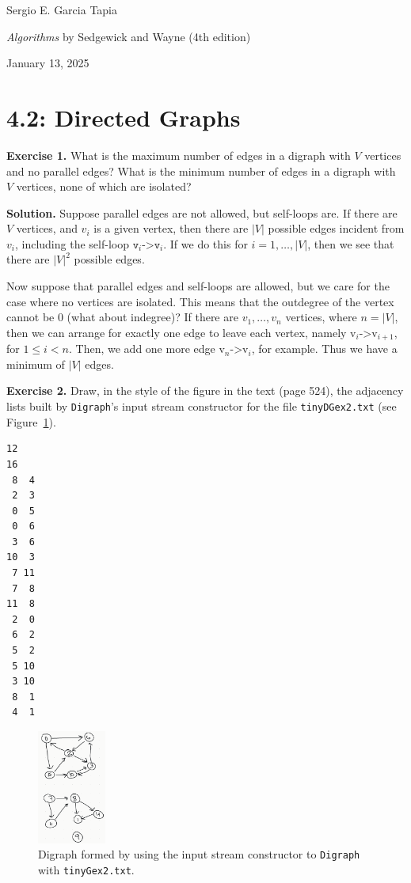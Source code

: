 \documentclass[12pt, a4paper]{article}
\newenvironment{ex}[2][Exercise]
{\par\medskip\noindent \textbf{#1 #2.}}
{\medskip}
\newenvironment{sol}[1][Solution]
{\par\medskip\noindent \textbf{#1.} }
{\medskip}
\begin{document}
	\noindent Sergio E. Garcia Tapia \hfill
	
	\noindent \emph{Algorithms} by Sedgewick and Wayne (4th edition) \cite{sedgewick_wayne}\hfill
	
	\noindent January 13, 2025\hfill 
	\section*{4.2: Directed Graphs}
	\begin{ex}{1}
		What is the maximum number of edges in a digraph with $V$ vertices and no parallel edges?
		What is the minimum number of edges in a digraph with $V$ vertices, none of which are isolated?
	\end{ex}
	\begin{sol}
		Suppose parallel edges are not allowed, but self-loops are. If there are $V$
		vertices, and $v_i$ is a given vertex, then there are $|V|$ possible edges
		incident from $v_i$, including the self-loop $\texttt{v}_i\texttt{->}\texttt{v}_i$.
		If we do this for $i=1,\ldots,|V|$, then we see that there are $|V|^2$ possible
		edges.
		
		Now suppose that parallel edges and self-loops are allowed, but we care for
		the case where no vertices are isolated. This means that the outdegree
		of the vertex cannot be 0 (what about indegree)? If there are $v_1,\ldots,v_n$
		vertices, where $n=|V|$, then we can arrange for exactly one edge to leave
		each vertex, namely $\text{v}_i\text{->}\text{v}_{i+1}$, for $1\leq i<n$. Then,
		we add one more edge $\text{v}_n\text{->}\text{v}_i$, for example. Thus we have a
		minimum of $|V|$ edges.
	\end{sol}
	\begin{ex}{2}
		Draw, in the style of the figure in the text (page 524), the adjacency lists
		built by \texttt{Digraph}'s input stream constructor for the file
		\texttt{tinyDGex2.txt} (see Figure~\ref{fig:tinyGex2}).
		\begin{lstlisting}[language={}]
12
16
 8  4
 2  3
 0  5
 0  6
 3  6
10  3
 7 11
 7  8
11  8
 2  0
 6  2
 5  2
 5 10
 3 10
 8  1
 4  1
		\end{lstlisting}
		\begin{figure}
			\centering
			\includegraphics[width=0.2\textwidth]{exercise-02-tinyGex2-graph}
			\caption{Digraph formed by using the input stream constructor to \texttt{Digraph}
			with \texttt{tinyGex2.txt}.}
			\label{fig:tinyGex2}
		\end{figure}
	\end{ex}
\end{document}
